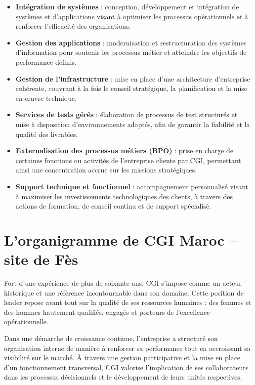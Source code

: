 \documentclass[12pt,a4paper]{report}
\begin{document}
\begin{itemize}
\item
  \textbf{Intégration de systèmes} : conception, développement et
  intégration de systèmes et d'applications visant à optimiser les
  processus opérationnels et à renforcer l'efficacité des organisations.
\item
  \textbf{Gestion des applications} : modernisation et restructuration
  des systèmes d'information pour soutenir les processus métier et
  atteindre les objectifs de performance définis.
\item
  \textbf{Gestion de l'infrastructure} : mise en place d'une
  architecture d'entreprise cohérente, couvrant à la fois le conseil
  stratégique, la planification et la mise en œuvre technique.
\item
  \textbf{Services de tests gérés} : élaboration de processus de test
  structurés et mise à disposition d'environnements adaptés, afin de
  garantir la fiabilité et la qualité des livrables.
\item
  \textbf{Externalisation des processus métiers (BPO)} : prise en charge
  de certaines fonctions ou activités de l'entreprise cliente par CGI,
  permettant ainsi une concentration accrue sur les missions
  stratégiques.
\item
  \textbf{Support technique et fonctionnel} : accompagnement
  personnalisé visant à maximiser les investissements technologiques des
  clients, à travers des actions de formation, de conseil continu et de
  support spécialisé.
\end{itemize}

\section{L'organigramme de CGI Maroc -- site de Fès}

Fort d'une expérience de plus de soixante ans, CGI s'impose comme un
acteur historique et une référence incontournable dans son domaine.
Cette position de leader repose avant tout sur la qualité de ses
ressources humaines : des femmes et des hommes hautement qualifiés,
engagés et porteurs de l'excellence opérationnelle.

Dans une démarche de croissance continue, l'entreprise a structuré son
organisation interne de manière à renforcer sa performance tout en
accroissant sa visibilité sur le marché. À travers une gestion
participative et la mise en place d'un fonctionnement transversal, CGI
valorise l'implication de ses collaborateurs dans les processus
décisionnels et le développement de leurs unités respectives.
\end{document}
